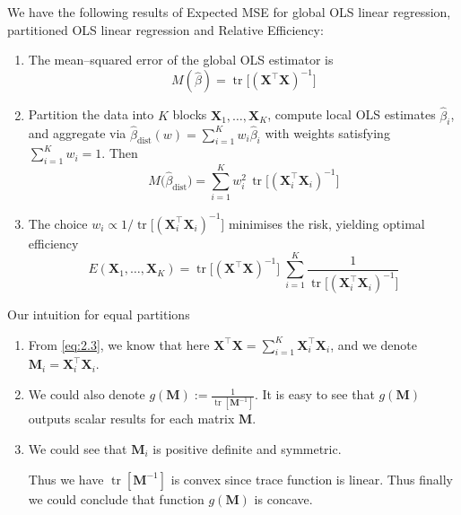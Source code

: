 \documentclass{beamer}
\theoremstyle{remark}
\begin{document}
\begin{frame}
We have the following results of Expected MSE for global OLS linear regression, partitioned OLS linear regression and Relative Efficiency:
    \begin{enumerate}
    \item The mean–squared error of the global OLS estimator is
          \[
            M(\hat\beta)=\operatorname{tr}\!\bigl[(\mathbf{X}^{\top}\mathbf{X})^{-1}\bigr]\tag{2.1} \label{eq:2.1}
          \]
    \item Partition the data into \(K\) blocks \(\mathbf{X}_1,\dots,\mathbf{X}_K\),
          compute local OLS estimates \(\hat\beta_{i}\), and aggregate via
          \(\hat\beta_{\mathrm{dist}}(w)=\sum_{i=1}^{K}w_{i}\hat\beta_{i}\)
          with weights satisfying \(\sum_{i=1}^{K}w_{i}=1\).
          Then
          \[
            M\!\bigl(\hat\beta_{\mathrm{dist}}\bigr)=
            \sum_{i=1}^{K}w_{i}^{2}\,
            \operatorname{tr}\!\bigl[(\mathbf{X}_{i}^{\top}\mathbf{X}_{i})^{-1}\bigr]\tag{2.2} \label{eq:2.2}
          \]
    \item The choice
          \(w_{i}\propto 1/\operatorname{tr}\!\bigl[(\mathbf{X}_{i}^{\top}\mathbf{X}_{i})^{-1}\bigr]\)
          minimises the risk, yielding optimal efficiency
          \[
            E(\mathbf{X}_{1},\dots,\mathbf{X}_{K})=
            \operatorname{tr}\!\bigl[(\mathbf{X}^{\top}\mathbf{X})^{-1}\bigr]\;
            \sum_{i=1}^{K}
            \frac{1}{\operatorname{tr}\!\bigl[(\mathbf{X}_{i}^{\top}\mathbf{X}_{i})^{-1}\bigr]}\tag{2.3} \label{eq:2.3}
          \]
    \end{enumerate}
\end{frame}
\begin{frame}{Our intuition for equal partitions}
\begin{enumerate}
\item From \ref{eq:2.3}, we know that here $\mathbf{X}^{\top}\mathbf{X} = \sum_{i=1}^{K}\mathbf{X}_i^{\top}\mathbf{X}_i$, and we denote $\mathbf{M}_i = \mathbf{X}_i^{\top}\mathbf{X}_i$.

\item We could also denote $g(\mathbf{M}) := \frac{1}{\operatorname{tr}[\mathbf{M}^{-1}]}$. It is easy to see that $g(\mathbf{M})$ outputs scalar results for each matrix $\mathbf{M}$.

\item We could see that $\mathbf{M}_i$ is positive definite and symmetric.

Thus we have $\operatorname{tr}[\mathbf{M}^{-1}]$ is convex since trace function is linear. Thus finally we could conclude that function $g(\mathbf{M})$ is concave.
\end{enumerate}
\end{frame}
\end{document}
